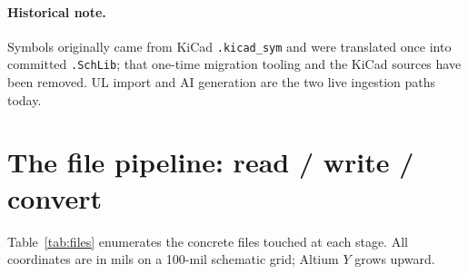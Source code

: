\documentclass[11pt]{article}
\newcommand{\file}[1]{\texttt{#1}}
\begin{document}
\paragraph{Historical note.} Symbols originally came from KiCad
\file{.kicad\_sym} and were translated once into committed \file{.SchLib}; that
one-time migration tooling and the KiCad sources have been removed. UL import and
AI generation are the two live ingestion paths today.

\section{The file pipeline: read / write / convert}

Table~\ref{tab:files} enumerates the concrete files touched at each stage. All
coordinates are in mils on a 100-mil schematic grid; Altium $Y$ grows upward.
\end{document}
